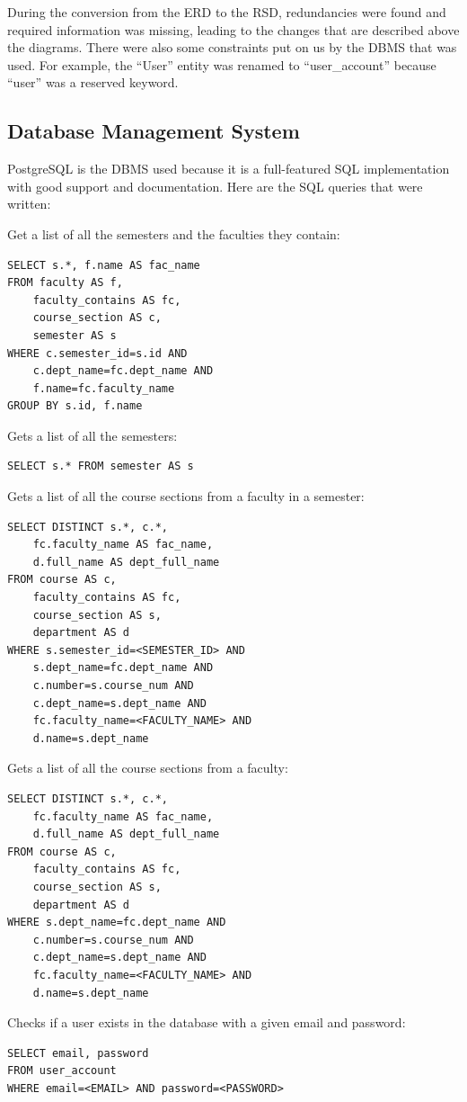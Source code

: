 \documentclass[twoside=false,a4paper,11pt]{article}
\theoremstyle{mytheor}
\begin{document}
During the conversion from the ERD to the RSD, redundancies were found and required information was missing, leading to the changes that are described above the diagrams. There were also some constraints put on us by the DBMS that was used. For example, the ``User'' entity was renamed to ``user\_account'' because ``user'' was a reserved keyword.

\subsection*{Database Management System}

PostgreSQL is the DBMS used because it is a full-featured SQL implementation with good support and documentation. Here are the SQL queries that were written:

Get a list of all the semesters and the faculties they contain:
\begin{lstlisting}
SELECT s.*, f.name AS fac_name
FROM faculty AS f,
	faculty_contains AS fc,
	course_section AS c,
	semester AS s
WHERE c.semester_id=s.id AND
	c.dept_name=fc.dept_name AND
	f.name=fc.faculty_name
GROUP BY s.id, f.name
\end{lstlisting}

Gets a list of all the semesters:
\begin{lstlisting}
SELECT s.* FROM semester AS s
\end{lstlisting}

Gets a list of all the course sections from a faculty in a semester:
\begin{lstlisting}
SELECT DISTINCT s.*, c.*,
	fc.faculty_name AS fac_name,
	d.full_name AS dept_full_name
FROM course AS c,
	faculty_contains AS fc,
	course_section AS s,
	department AS d
WHERE s.semester_id=<SEMESTER_ID> AND
	s.dept_name=fc.dept_name AND
	c.number=s.course_num AND
	c.dept_name=s.dept_name AND
	fc.faculty_name=<FACULTY_NAME> AND
	d.name=s.dept_name
\end{lstlisting}

Gets a list of all the course sections from a faculty:
\begin{lstlisting}
SELECT DISTINCT s.*, c.*,
	fc.faculty_name AS fac_name,
	d.full_name AS dept_full_name
FROM course AS c,
	faculty_contains AS fc,
	course_section AS s,
	department AS d
WHERE s.dept_name=fc.dept_name AND
	c.number=s.course_num AND
	c.dept_name=s.dept_name AND
	fc.faculty_name=<FACULTY_NAME> AND
	d.name=s.dept_name
\end{lstlisting}

\pagebreak
Checks if a user exists in the database with a given email and password:
\begin{lstlisting}
SELECT email, password
FROM user_account
WHERE email=<EMAIL> AND password=<PASSWORD>
\end{lstlisting}
\end{document}
